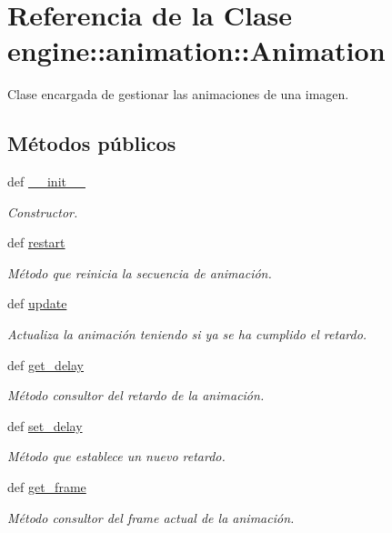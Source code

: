 \hypertarget{classengine_1_1animation_1_1Animation}{
\section{\-Referencia de la \-Clase engine\-:\-:animation\-:\-:\-Animation}
\label{classengine_1_1animation_1_1Animation}
}


\-Clase encargada de gestionar las animaciones de una imagen.  


\subsection*{\-Métodos públicos}
\begin{DoxyCompactItemize}
\item 
def \hyperlink{classengine_1_1animation_1_1Animation_ab18204a83ffa13a1c56b1822ab5c0a4e}{\-\_\-\-\_\-init\-\_\-\-\_\-}
\begin{DoxyCompactList}\small\item\em \-Constructor. \end{DoxyCompactList}\item 
\hypertarget{classengine_1_1animation_1_1Animation_a8b880c5eb6bd43f002a7c021f83f15f6}{
def \hyperlink{classengine_1_1animation_1_1Animation_a8b880c5eb6bd43f002a7c021f83f15f6}{restart}}
\label{classengine_1_1animation_1_1Animation_a8b880c5eb6bd43f002a7c021f83f15f6}

\begin{DoxyCompactList}\small\item\em \-Método que reinicia la secuencia de animación. \end{DoxyCompactList}\item 
def \hyperlink{classengine_1_1animation_1_1Animation_abf2dbfa119054a53a3e667657fd6655d}{update}
\begin{DoxyCompactList}\small\item\em \-Actualiza la animación teniendo si ya se ha cumplido el retardo. \end{DoxyCompactList}\item 
def \hyperlink{classengine_1_1animation_1_1Animation_af0d1116a6fae9c290bafdd3cb989c0d7}{get\-\_\-delay}
\begin{DoxyCompactList}\small\item\em \-Método consultor del retardo de la animación. \end{DoxyCompactList}\item 
def \hyperlink{classengine_1_1animation_1_1Animation_a8b11538f08a8459bd5854ff818837b25}{set\-\_\-delay}
\begin{DoxyCompactList}\small\item\em \-Método que establece un nuevo retardo. \end{DoxyCompactList}\item 
def \hyperlink{classengine_1_1animation_1_1Animation_a48acfa31d9e645b1f8145aedac341aff}{get\-\_\-frame}
\begin{DoxyCompactList}\small\item\em \-Método consultor del frame actual de la animación. \end{DoxyCompactList}\end{DoxyCompactItemize}
